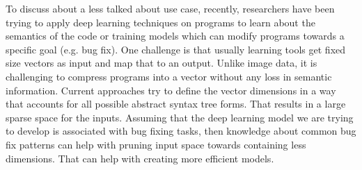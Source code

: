 To discuss about a less talked about use case, recently, researchers have been trying to apply deep learning techniques on programs to learn about the semantics of the code or training models which can modify programs towards a specific goal (e.g. bug fix). One challenge is that usually learning tools get fixed size vectors as input and map that to an output. Unlike image data, it is challenging to compress programs into a vector without any loss in semantic information. Current approaches try to define the vector dimensions in a way that accounts for all possible abstract syntax tree forms. That results in a large sparse space for the inputs. Assuming that the deep learning model we are trying to develop is associated with bug fixing tasks, then knowledge about common bug fix patterns can help with pruning input space towards containing less dimensions. That can help with creating more efficient models.

